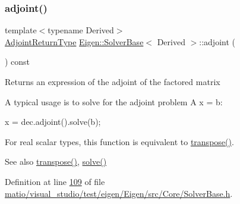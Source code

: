 \subsubsection{\texorpdfstring{adjoint()}{adjoint()}\hspace{0.1cm}{\footnotesize\ttfamily [2/2]}}
{\footnotesize\ttfamily template$<$typename Derived$>$ \\
\hyperlink{class_eigen_1_1internal_1_1_tensor_lazy_evaluator_writable}{Adjoint\+Return\+Type} \hyperlink{class_eigen_1_1_solver_base}{Eigen\+::\+Solver\+Base}$<$ Derived $>$\+::adjoint (\begin{DoxyParamCaption}{ }\end{DoxyParamCaption}) const\hspace{0.3cm}{\ttfamily [inline]}}

\begin{DoxyReturn}{Returns}
an expression of the adjoint of the factored matrix
\end{DoxyReturn}
A typical usage is to solve for the adjoint problem A\textquotesingle{} x = b\+: 
\begin{DoxyCode}
x = dec.adjoint().solve(b); 
\end{DoxyCode}


For real scalar types, this function is equivalent to \hyperlink{class_eigen_1_1_solver_base_a732e75b5132bb4db3775916927b0e86c}{transpose()}.

\begin{DoxySeeAlso}{See also}
\hyperlink{class_eigen_1_1_solver_base_a732e75b5132bb4db3775916927b0e86c}{transpose()}, \hyperlink{class_eigen_1_1_solver_base_a7fd647d110487799205df6f99547879d}{solve()} 
\end{DoxySeeAlso}


Definition at line \hyperlink{matio_2visual__studio_2test_2eigen_2_eigen_2src_2_core_2_solver_base_8h_source_l00109}{109} of file \hyperlink{matio_2visual__studio_2test_2eigen_2_eigen_2src_2_core_2_solver_base_8h_source}{matio/visual\+\_\+studio/test/eigen/\+Eigen/src/\+Core/\+Solver\+Base.\+h}.

\mbox{\label{class_eigen_1_1_solver_base_a7fd647d110487799205df6f99547879d}} 
